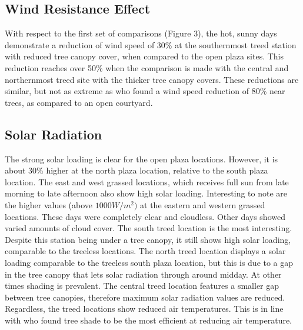 \documentclass[twocolumn, a4paper]{article}
\begin{document}
\subsection{Wind Resistance Effect}
With respect to the first set of comparisons (Figure 3), the hot, sunny days demonstrate a reduction of wind speed of 30\% at the southernmost treed station with reduced tree canopy cover, when compared to the open plaza sites. This reduction reaches over 50\% when the comparison is made with the central and northernmost treed site with the thicker tree canopy covers. These reductions are similar, but not as extreme as \cite{SHASHUABAR2009179} who found a wind speed reduction of 80\% near trees, as compared to an open courtyard.

\subsection{Solar Radiation}
The strong solar loading is clear for the open plaza locations. However, it is about 30\% higher at the north plaza location, relative to the south plaza location. The east and west grassed locations, which receives full sun from late morning to late afternoon also show high solar loading. Interesting to note are the higher values (above $1000  W/m^2)$ at the eastern and western grassed locations. 
These days were completely clear and cloudless. Other days showed varied amounts of cloud cover. The south treed location is the most interesting. Despite this station being under a tree canopy, it still shows high solar loading, comparable to the treeless locations. The north treed location displays a solar loading comparable to the treeless south plaza location, but this is due to a gap in the tree canopy that lets solar radiation through around midday. At other times shading is prevalent. The central treed location features a smaller gap between tree canopies, therefore maximum solar radiation values are reduced. Regardless, the treed locations show reduced air temperatures. This is in line with \cite{SHASHUABAR2009179} who found tree shade to be the most efficient at reducing air temperature.
\\
\end{document}
